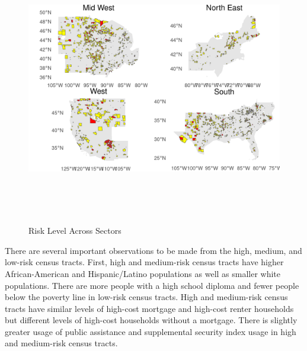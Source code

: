  \begin{figure}[htbp]
    \centering
     \includegraphics[width=\textwidth, height=12cm]{plots/regional_risk_map.png}
     \caption{Risk Level Across Sectors}
     \label{fig:regional_risk_map}
 \end{figure}

There are several important observations to be made from the high, medium, and low-risk census tracts. First, high and medium-risk census tracts have higher African-American and Hispanic/Latino populations as well as smaller white populations.  There are more people with a high school diploma and fewer people below the poverty line in low-risk census tracts. High and medium-risk census tracts have similar levels of high-cost mortgage and high-cost renter households but different levels of high-cost households without a mortgage. There is slightly greater usage of public assistance and supplemental security index usage in high and medium-risk census tracts. 

\endinput
